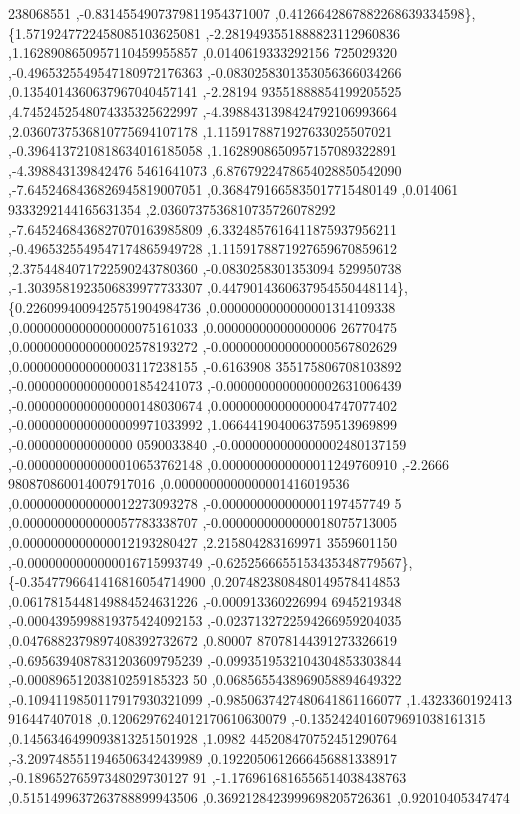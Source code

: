 \begin{DoxyCode}
      238068551 ,-0.8314554907379811954371007 ,0.4126642867882268639334598\},
\{1.5719247722458085103625081 ,-2.2819493551888823112960836 ,1.1628908650957110459955857 ,0.0140619333292156
      725029320 ,-0.4965325549547180972176363 ,-0.0830258301353056366034266 ,0.1354014360637967040457141 ,-2.28194
      93551888854199205525 ,4.7452452548074335325622997 ,-4.3988431398424792106993664 ,2.0360737536810775694107178
       ,1.1159178871927633025507021 ,-0.3964137210818634016185058 ,1.1628908650957157089322891 ,-4.398843139842476
      5461641073 ,6.8767922478654028850542090 ,-7.6452468436826945819007051 ,0.3684791665835017715480149 ,0.014061
      9333292144165631354 ,2.0360737536810735726078292 ,-7.6452468436827070163985809 ,6.3324857616411875937956211 
      ,-0.4965325549547174865949728 ,1.1159178871927659670859612 ,2.3754484071722590243780360 ,-0.0830258301353094
      529950738 ,-1.3039581923506839977733307 ,0.4479014360637954550448114\},
\{0.2260994009425751904984736 ,0.0000000000000001314109338 ,0.0000000000000000075161033 ,0.00000000000000006
      26770475 ,0.0000000000000002578193272 ,-0.0000000000000000567802629 ,0.0000000000000003117238155 ,-0.6163908
      355175806708103892 ,-0.0000000000000001854241073 ,-0.0000000000000002631006439 ,-0.0000000000000000148030674
       ,0.0000000000000004747077402 ,-0.0000000000000009971033992 ,1.0664419040063759513969899 ,-0.000000000000000
      0590033840 ,-0.0000000000000002480137159 ,-0.0000000000000010653762148 ,0.0000000000000011249760910 ,-2.2666
      980870860014007917016 ,0.0000000000000001416019536 ,0.0000000000000012273093278 ,-0.000000000000001197457749
      5 ,0.0000000000000057783338707 ,-0.0000000000000018075713005 ,0.0000000000000012193280427 ,2.215804283169971
      3559601150 ,-0.0000000000000016715993749 ,-0.6252566655153435348779567\},
\{-0.3547796641416816054714900 ,0.2074823808480149578414853 ,0.0617815448149884524631226 ,-0.000913360226994
      6945219348 ,-0.0004395998819375424092153 ,-0.0237132722594266959204035 ,0.0476882379897408392732672 ,0.80007
      87078144391273326619 ,-0.6956394087831203609795239 ,-0.0993519532104304853303844 ,-0.00089651203810259185323
      50 ,0.0685655438969058894649322 ,-0.1094119850117917930321099 ,-0.9850637427480641861166077 ,1.4323360192413
      916447407018 ,0.1206297624012170610630079 ,-0.1352424016079691038161315 ,0.1456346499093813251501928 ,1.0982
      445208470752451290764 ,-3.2097485511946506342439989 ,0.1922050612666456881338917 ,-0.18965276597348029730127
      91 ,-1.1769616816556514038438763 ,0.5151499637263788899943506 ,0.3692128423999698205726361 ,0.92010405347474

\end{DoxyCode}
